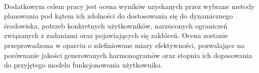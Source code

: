\\\indent Dodatkowym celem pracy jest ocena wyników uzyskanych przez wybrane metody planowania pod kątem ich zdolności do dostosowania się do dynamicznego środowiska, potrzeb konkretnych użytkowników, narzuconych ograniczeń związanych z zadaniami oraz pojawiających się zakłóceń. Ocena zostanie przeprowadzona w oparciu o zdefiniowane miary efektywności, pozwalające na porównanie jakości generowanych harmonogramów oraz stopnia ich dopasowania do przyjętego modelu funkcjonowania użytkownika.